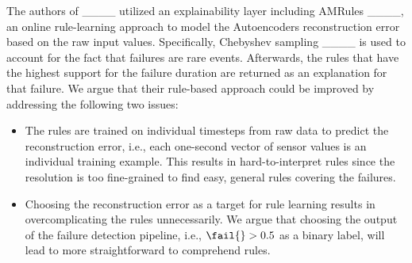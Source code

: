 The authors of ____ utilized an explainability layer including AMRules ____, an online rule-learning approach to model the Autoencoders reconstruction error based on the raw input values.
Specifically, Chebyshev sampling ____ is used to account for the fact that failures are rare events.
Afterwards, the rules that have the highest support for the failure duration are returned as an explanation for that failure.
We argue that their rule-based approach could be improved by addressing the following two issues:
\begin{itemize}
    \item The rules are trained on individual timesteps from raw data to predict the reconstruction error, i.e., each one-second vector of sensor values is an individual training example. This results in hard-to-interpret rules since the resolution is too fine-grained to find easy, general rules covering the failures.
    \item Choosing the reconstruction error as a target for rule learning results in overcomplicating the rules unnecessarily. We argue that choosing the output of the failure detection pipeline, i.e., $ \fail{} > 0.5 $ as a binary label, will lead to more straightforward to comprehend rules.
\end{itemize}